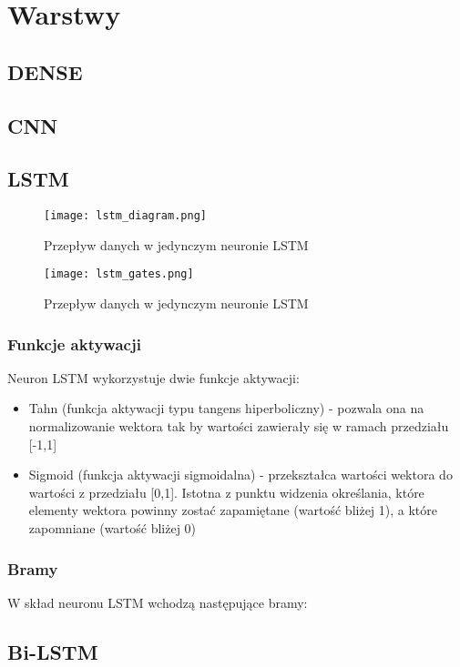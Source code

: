 \newpage %
\section{Warstwy}

\subsection{DENSE}
\subsection{CNN}
\subsection{LSTM}


\begin{figure}[!h]
    \label{fig:lstm_diagram}
    \centering \texttt{[image: lstm\_diagram.png]}
    \caption{Przepływ danych w jedynczym neuronie LSTM}
\end{figure}


\begin{figure}[!h]
    \label{fig:lstm_gates}
    \centering \texttt{[image: lstm\_gates.png]}
    \caption{Przepływ danych w jedynczym neuronie LSTM}
\end{figure}


\subsubsection{Funkcje aktywacji}

Neuron LSTM wykorzystuje dwie funkcje aktywacji: 

\begin{itemize}
    \item Tahn (funkcja aktywacji typu tangens hiperboliczny) - pozwala ona na normalizowanie wektora tak by wartości zawierały się w ramach przedziału [-1,1] 
    \item Sigmoid (funkcja aktywacji sigmoidalna) - przekształca wartości wektora do wartości z przedziału [0,1]. Istotna z punktu widzenia określania, które elementy wektora powinny zostać zapamiętane (wartość bliżej 1), a które zapomniane (wartość bliżej 0) 
\end{itemize}


\subsubsection{Bramy}

W skład neuronu LSTM wchodzą następujące bramy: 


\subsection{Bi-LSTM}



 



 